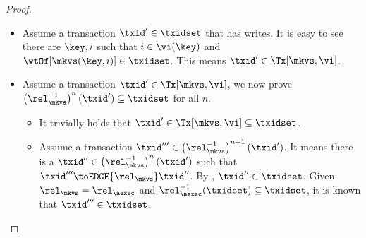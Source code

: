 \begin{proof}
    \begin{itemize}
    \item Assume a transaction \( \txid' \in \txidset \) that has writes.
    It is easy to see there are \( \key,i \) such that \( i \in \vi(\key) \) and
    \( \wtOf[\mkvs(\key,i)] \in \txidset \).
    This means \( \txid' \in \Tx[\mkvs,\vi] \).
    \item Assume a transaction \( \txid' \in \Tx[\mkvs,\vi] \),
    we now prove \( \left(\rel_\mkvs^{-1}\right)^{n}(\txid') \subseteq \txidset \) for all \( n \).
    \begin{itemize}
        \item {} It trivially holds that  \( \txid' \in \Tx[\mkvs,\vi]  \subseteq \txidset \).
        \item {} 
            Assume a transaction \( \txid''' \in \left(\rel_\mkvs^{-1}\right)^{n + 1}(\txid') \).
            It means there is a \( \txid'' \in \left(\rel_\mkvs^{-1}\right)^{n}(\txid') \) such that \( \txid''' \toEDGE{\rel_\mkvs} \txid'' \).
            By \ih, \( \txid'' \in \txidset \).
            Given \( \rel_\mkvs = \rel_\aexec \) and \( \rel_\aexec^{-1}(\txidset) \subseteq \txidset\),
            it is known that \( \txid''' \in \txidset \).
    \end{itemize}
    \end{itemize}
\end{proof}













